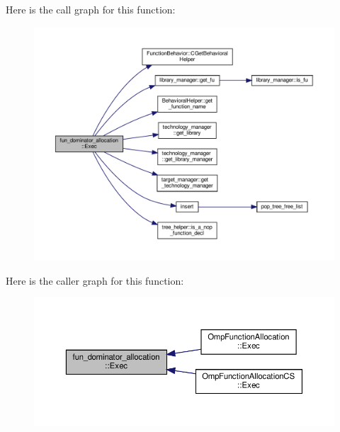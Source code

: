 Here is the call graph for this function\+:
\nopagebreak
\begin{figure}[H]
\begin{center}
\leavevmode
\includegraphics[width=350pt]{d3/d75/classfun__dominator__allocation_aab3d1e1e5b22f40816fa73325bcab578_cgraph}
\end{center}
\end{figure}
Here is the caller graph for this function\+:
\nopagebreak
\begin{figure}[H]
\begin{center}
\leavevmode
\includegraphics[width=350pt]{d3/d75/classfun__dominator__allocation_aab3d1e1e5b22f40816fa73325bcab578_icgraph}
\end{center}
\end{figure}
\mbox{\label{classfun__dominator__allocation_afde71d1d22d09ffa5f2afaf0c73ab4b0}} 
